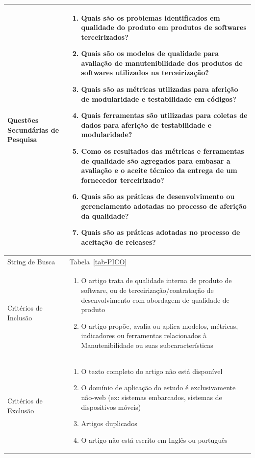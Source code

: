 \begin{longtable}{|p{4.5cm}|p{10.6cm}|}
    Questões Secundárias de Pesquisa & \begin{enumerate}[nosep, leftmargin=*]
        \item Quais são os problemas identificados em qualidade do produto em produtos de softwares terceirizados?
        \item Quais são os modelos de qualidade para avaliação de manutenibilidade dos produtos de softwares utilizados na terceirização?
        \item Quais são as métricas utilizadas para aferição de modularidade e testabilidade em códigos?
        \item Quais ferramentas são utilizadas para coletas de dados para aferição de testabilidade e modularidade?
        \item Como os resultados das métricas e ferramentas de qualidade são agregados para embasar a avaliação e o aceite técnico da entrega de um fornecedor terceirizado?
        \item Quais são as práticas de desenvolvimento ou gerenciamento adotadas no processo de aferição da qualidade?
        \item Quais são as práticas adotadas no processo de aceitação de releases?
    \end{enumerate} \\
    \hline
    String de Busca & Tabela~\ref{tab-PICO} \\
    \hline
    Critérios de Inclusão & \begin{enumerate}[nosep, leftmargin=*]
        \item O artigo trata de qualidade interna de produto de software, ou de terceirização/contratação de desenvolvimento com abordagem de qualidade de produto
        \item O artigo propõe, avalia ou aplica modelos, métricas, indicadores ou ferramentas relacionados à Manutenibilidade ou suas subcaracterísticas
    \end{enumerate} \\
    \hline
    Critérios de Exclusão & \begin{enumerate}[nosep, leftmargin=*]
        \item O texto completo do artigo não está disponível
        \item O domínio de aplicação do estudo é exclusivamente não-web (ex: sistemas embarcados, sistemas de dispositivos móveis)
        \item Artigos duplicados
        \item O artigo não está escrito em Inglês ou português

\end{enumerate}
\end{longtable}
